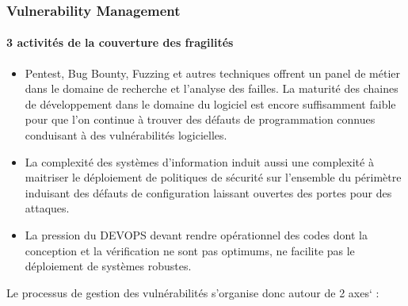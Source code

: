 \begin{frame}
\frametitle<presentation>{Vulnerability Management}
\framesubtitle<presentation>{3 activités de la couverture des fragilités}
\begin{itemize}
  \item Pentest, Bug Bounty, Fuzzing et autres techniques offrent un panel de métier dans le domaine de recherche et l'analyse des failles. La maturité des chaines de développement dans le domaine du logiciel est encore suffisamment faible pour que l'on continue à trouver des défauts de programmation connues conduisant à des  vulnérabilités  logicielles.
  \item La complexité des systèmes d'information induit aussi une complexité à maitriser le déploiement de politiques de sécurité sur l'ensemble du périmètre induisant des défauts de configuration laissant ouvertes des portes pour des attaques. 
  \item La pression du DEVOPS devant rendre opérationnel des codes dont la conception et la vérification ne sont pas optimums, ne facilite pas le déploiement de systèmes robustes.
\end{itemize}
\end{frame}

Le processus de gestion des vulnérabilités     s'organise donc autour de 2 axes`\cite{wang2009ovm} :

